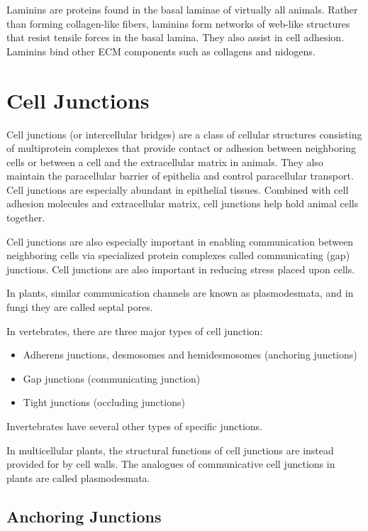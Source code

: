 \documentclass[
]{book}
\providecommand{\tightlist}{%
  \setlength{\itemsep}{0pt}\setlength{\parskip}{0pt}}
\begin{document}
Laminins are proteins found in the basal laminae of virtually all animals. Rather than forming collagen-like fibers, laminins form networks of web-like structures that resist tensile forces in the basal lamina. They also assist in cell adhesion. Laminins bind other ECM components such as collagens and nidogens.

\hypertarget{cell-junctions}{%
\section{Cell Junctions}\label{cell-junctions}}

Cell junctions (or intercellular bridges) are a class of cellular structures consisting of multiprotein complexes that provide contact or adhesion between neighboring cells or between a cell and the extracellular matrix in animals. They also maintain the paracellular barrier of epithelia and control paracellular transport. Cell junctions are especially abundant in epithelial tissues. Combined with cell adhesion molecules and extracellular matrix, cell junctions help hold animal cells together.

Cell junctions are also especially important in enabling communication between neighboring cells via specialized protein complexes called communicating (gap) junctions. Cell junctions are also important in reducing stress placed upon cells.

In plants, similar communication channels are known as plasmodesmata, and in fungi they are called septal pores.

In vertebrates, there are three major types of cell junction:

\begin{itemize}
\tightlist
\item
  Adherens junctions, desmosomes and hemidesmosomes (anchoring junctions)
\item
  Gap junctions (communicating junction)
\item
  Tight junctions (occluding junctions)
\end{itemize}

Invertebrates have several other types of specific junctions.

In multicellular plants, the structural functions of cell junctions are instead provided for by cell walls. The analogues of communicative cell junctions in plants are called plasmodesmata.

\hypertarget{anchoring-junctions}{%
\subsection{Anchoring Junctions}\label{anchoring-junctions}}
\end{document}
